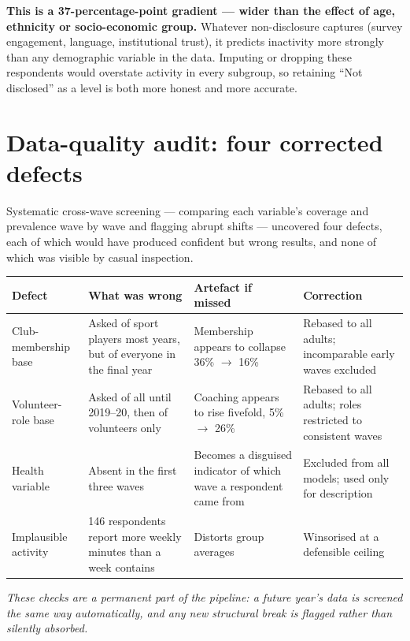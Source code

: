\documentclass[ %
                    author={Ashrey Ashrey, Sanya Kapoor, Trisha Sharma, Yash Bhooshan Pandloskar},
                supervisor={Dr. Dalila O’Grady},
                    degree={MSc},
                     title={Using machine learning to forecast physical activity participation, volunteering and activity patterns in London},
                  subtitle={},
                      type={},
                      year={2021}]{dissertation}
\begin{document}
\noindent
\textbf{This is a 37-percentage-point gradient --- wider than the effect of age, ethnicity or socio-economic group.} Whatever non-disclosure captures (survey engagement, language, institutional trust), it predicts inactivity more strongly than any demographic variable in the data. Imputing or dropping these respondents would overstate activity in every subgroup, so retaining ``Not disclosed'' as a level is both more honest and more accurate.

\section{Data-quality audit: four corrected defects}

\noindent
Systematic cross-wave screening --- comparing each variable's coverage and prevalence wave by wave and flagging abrupt shifts --- uncovered four defects, each of which would have produced confident but wrong results, and none of which was visible by casual inspection.

\begin{table}[!htb]
\centering
\small
\begin{tabularx}{\textwidth}{@{}lXXX@{}}
\toprule
\textbf{Defect} & \textbf{What was wrong} & \textbf{Artefact if missed} & \textbf{Correction} \\
\midrule
Club-membership base & Asked of sport players most years, but of everyone in the final year & Membership appears to collapse 36\% $\rightarrow$ 16\% & Rebased to all adults; incomparable early waves excluded \\
Volunteer-role base & Asked of all until 2019--20, then of volunteers only & Coaching appears to rise fivefold, 5\% $\rightarrow$ 26\% & Rebased to all adults; roles restricted to consistent waves \\
Health variable & Absent in the first three waves & Becomes a disguised indicator of which wave a respondent came from & Excluded from all models; used only for description \\
Implausible activity & 146 respondents report more weekly minutes than a week contains & Distorts group averages & Winsorised at a defensible ceiling \\
\bottomrule
\end{tabularx}
\end{table}

\noindent
\emph{These checks are a permanent part of the pipeline: a future year's data is screened the same way automatically, and any new structural break is flagged rather than silently absorbed.}
\end{document}
